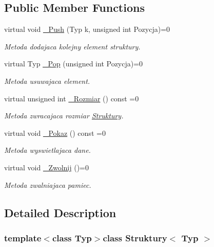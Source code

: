 \subsection*{Public Member Functions}
\begin{DoxyCompactItemize}
\item 
virtual void \hyperlink{class_struktury_aac09c019a75dd7bfda2f313733300c4c}{\-\_\-\-Push} (Typ k, unsigned int Pozycja)=0
\begin{DoxyCompactList}\small\item\em Metoda dodajaca kolejny element struktury. \end{DoxyCompactList}\item 
virtual Typ \hyperlink{class_struktury_a536345360bdb841d5462b578fe758b73}{\-\_\-\-Pop} (unsigned int Pozycja)=0
\begin{DoxyCompactList}\small\item\em Metoda usuwajaca element. \end{DoxyCompactList}\item 
virtual unsigned int \hyperlink{class_struktury_a3ed3c70e26cefc242633abc13097acce}{\-\_\-\-Rozmiar} () const =0
\begin{DoxyCompactList}\small\item\em Metoda zwracajaca rozmiar \hyperlink{class_struktury}{Struktury}. \end{DoxyCompactList}\item 
virtual void \hyperlink{class_struktury_a9a4290d332a6a613f92d4d4bfe2577ae}{\-\_\-\-Pokaz} () const =0
\begin{DoxyCompactList}\small\item\em Metoda wyswietlajaca dane. \end{DoxyCompactList}\item 
virtual void \hyperlink{class_struktury_aa85ab98de0f8bb1c257e6d1723d107f5}{\-\_\-\-Zwolnij} ()=0
\begin{DoxyCompactList}\small\item\em Metoda zwalniajaca pamiec. \end{DoxyCompactList}\end{DoxyCompactItemize}


\subsection{Detailed Description}
\subsubsection*{template$<$class Typ$>$class Struktury$<$ Typ $>$}

